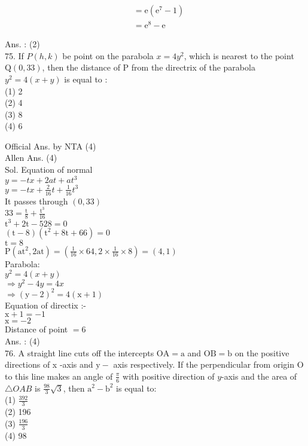 \documentclass[10pt]{article}
\begin{document}
\[
\begin{aligned}
& =\mathrm{e}\left(\mathrm{e}^{7}-1\right) \\
& =\mathrm{e}^{8}-\mathrm{e}
\end{aligned}
\]

Ans. : (2)\\
75. If \(P(h, k)\) be point on the parabola \(x=4 y^{2}\), which is nearest to the point \(\mathrm{Q}(0,33)\), then the distance of P from the directrix of the parabola \(y^{2}=4(x+y)\) is equal to :\\
(1) 2\\
(2) 4\\
(3) 8\\
(4) 6

Official Ans. by NTA (4)\\
Allen Ans. (4)\\
Sol. Equation of normal\\
\(y=-t x+2 a t+a t^{3}\)\\
\(y=-t x+\frac{2}{16} t+\frac{1}{16} t^{3}\)\\
It passes through \((0,33)\)\\
\(33=\frac{\mathrm{t}}{8}+\frac{\mathrm{t}^{3}}{16}\)\\
\(\mathrm{t}^{3}+2 \mathrm{t}-528=0\)\\
\((\mathrm{t}-8)\left(\mathrm{t}^{2}+8 \mathrm{t}+66\right)=0\)\\
\(\mathrm{t}=8\)\\
\(\mathrm{P}\left(\mathrm{at}^{2}, 2 \mathrm{at}\right)=\left(\frac{1}{16} \times 64,2 \times \frac{1}{16} \times 8\right)=(4,1)\)\\
Parabola:\\
\(y^{2}=4(x+y)\)\\
\(\Rightarrow y^{2}-4 y=4 x\)\\
\(\Rightarrow(\mathrm{y}-2)^{2}=4(\mathrm{x}+1)\)\\
Equation of directix :-\\
\(\mathrm{x}+1=-1\)\\
\(\mathrm{x}=-2\)\\
Distance of point \(=6\)\\
Ans. : (4)\\
76. A straight line cuts off the intercepts \(\mathrm{OA}=\mathrm{a}\) and \(\mathrm{OB}=\mathrm{b}\) on the positive directions of x -axis and \(\mathrm{y}-\) axis respectively. If the perpendicular from origin O to this line makes an angle of \(\frac{\pi}{6}\) with positive direction of \(y\)-axis and the area of \(\triangle O A B\) is \(\frac{98}{3} \sqrt{3}\), then \(\mathrm{a}^{2}-\mathrm{b}^{2}\) is equal to:\\
(1) \(\frac{392}{3}\)\\
(2) 196\\
(3) \(\frac{196}{3}\)\\
(4) 98
\end{document}
